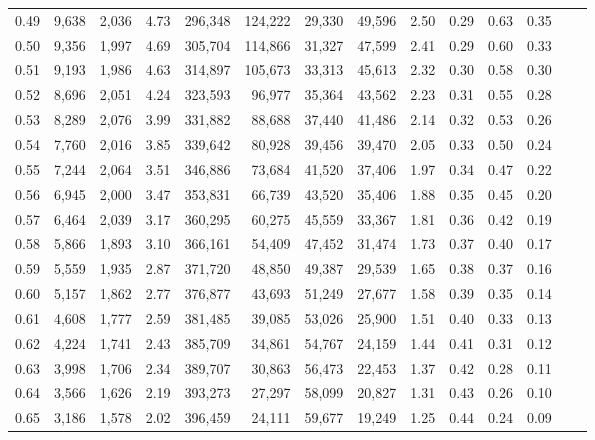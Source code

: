 \begin{tabular}{rrrrrrrrrrrrrr}
0.49 &   9,638 &  2,036 &    4.73 &  296,348 &  124,222 &  29,330 &  49,596 &  2.50 &  0.29 &  0.63 &      0.35 \\
0.50 &   9,356 &  1,997 &    4.69 &  305,704 &  114,866 &  31,327 &  47,599 &  2.41 &  0.29 &  0.60 &      0.33 \\
0.51 &   9,193 &  1,986 &    4.63 &  314,897 &  105,673 &  33,313 &  45,613 &  2.32 &  0.30 &  0.58 &      0.30 \\
0.52 &   8,696 &  2,051 &    4.24 &  323,593 &   96,977 &  35,364 &  43,562 &  2.23 &  0.31 &  0.55 &      0.28 \\
0.53 &   8,289 &  2,076 &    3.99 &  331,882 &   88,688 &  37,440 &  41,486 &  2.14 &  0.32 &  0.53 &      0.26 \\
0.54 &   7,760 &  2,016 &    3.85 &  339,642 &   80,928 &  39,456 &  39,470 &  2.05 &  0.33 &  0.50 &      0.24 \\
0.55 &   7,244 &  2,064 &    3.51 &  346,886 &   73,684 &  41,520 &  37,406 &  1.97 &  0.34 &  0.47 &      0.22 \\
0.56 &   6,945 &  2,000 &    3.47 &  353,831 &   66,739 &  43,520 &  35,406 &  1.88 &  0.35 &  0.45 &      0.20 \\
0.57 &   6,464 &  2,039 &    3.17 &  360,295 &   60,275 &  45,559 &  33,367 &  1.81 &  0.36 &  0.42 &      0.19 \\
0.58 &   5,866 &  1,893 &    3.10 &  366,161 &   54,409 &  47,452 &  31,474 &  1.73 &  0.37 &  0.40 &      0.17 \\
0.59 &   5,559 &  1,935 &    2.87 &  371,720 &   48,850 &  49,387 &  29,539 &  1.65 &  0.38 &  0.37 &      0.16 \\
0.60 &   5,157 &  1,862 &    2.77 &  376,877 &   43,693 &  51,249 &  27,677 &  1.58 &  0.39 &  0.35 &      0.14 \\
0.61 &   4,608 &  1,777 &    2.59 &  381,485 &   39,085 &  53,026 &  25,900 &  1.51 &  0.40 &  0.33 &      0.13 \\
0.62 &   4,224 &  1,741 &    2.43 &  385,709 &   34,861 &  54,767 &  24,159 &  1.44 &  0.41 &  0.31 &      0.12 \\
0.63 &   3,998 &  1,706 &    2.34 &  389,707 &   30,863 &  56,473 &  22,453 &  1.37 &  0.42 &  0.28 &      0.11 \\
0.64 &   3,566 &  1,626 &    2.19 &  393,273 &   27,297 &  58,099 &  20,827 &  1.31 &  0.43 &  0.26 &      0.10 \\
0.65 &   3,186 &  1,578 &    2.02 &  396,459 &   24,111 &  59,677 &  19,249 &  1.25 &  0.44 &  0.24 &      0.09 \\

\end{tabular}
